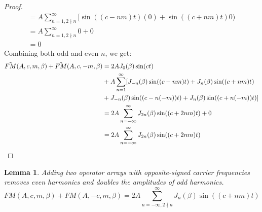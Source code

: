 \documentclass[11pt,twoside]{report}
\newtheorem{lem}[thm]{Lemma}
\numberwithin{thm}{section}
\numberwithin{equation}{section}
\begin{document}
\begin{proof}
\begin{align*}
    = A\sum_{n=1, 2\nmid n}^\infty [ \sin((c-nm)t)(0) + \sin((c+nm)t)0 ) \\
    = A\sum_{n=1, 2\nmid n}^\infty 0 + 0 \\
    = 0
\end{align*}
Combining both odd and even $n$, we get:
\begin{align*}
\Tilde{FM}(A, c, m, \beta) + \Tilde{FM}(A, c, -m, \beta) &= 2A J_0(\beta)\sin(ct) \\
&+ A\sum_{n=1}^\infty [ J_{-n}(\beta)\sin((c-nm)t) + J_{n}(\beta)\sin((c+nm)t)  \\
    &+ J_{-n}(\beta)\sin((c-n(-m))t) + J_{n}(\beta)\sin((c+n(-m))t) ]\\
    &= 2A \sum_{n=-\infty}^\infty J_{2n}(\beta)\sin((c + 2nm)t) + 0 \\
    &= 2A \sum_{n=-\infty}^\infty J_{2n}(\beta)\sin((c + 2nm)t)
\end{align*}
\end{proof}

\begin{lem} Adding two operator arrays with opposite-signed carrier frequencies removes even harmonics and doubles the amplitudes of odd harmonics.
$$\displaystyle FM(A, c, m, \beta) + FM(A, -c, m, \beta) = 2A\sum_{n=-\infty, 2\nmid n}^\infty J_{n}(\beta)\sin((c + nm)t)$$
\end{lem}
\end{document}
